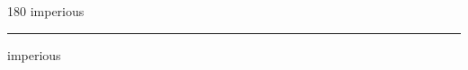 
\begin{frame}
\begin{center}
\begin{turn}{180}
{\fontsize{2.5cm}{1em}\selectfont imperious}
\end{turn}
\vspace{1em}\par  
\hrule
\vspace{1em}\par  
{\fontsize{2.5cm}{1em}\selectfont imperious}
\end{center}
\end{frame}
